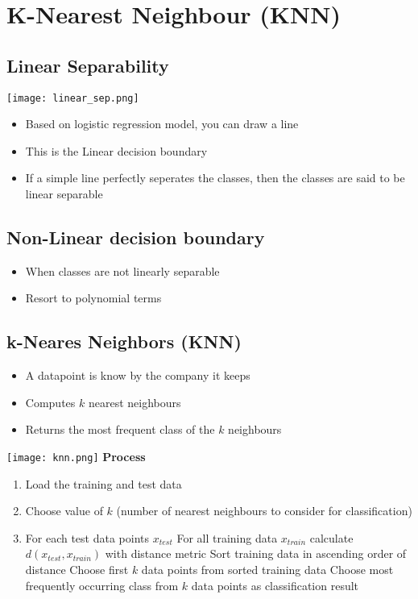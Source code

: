 \section{K-Nearest Neighbour (KNN)}
\subsection{Linear Separability}
\texttt{[image: linear\_sep.png]}

\begin{itemize}
    \item Based on logistic regression model, you can draw a line
    \item This is the Linear decision boundary
    \item If a simple line perfectly seperates the classes, then the classes are said to be linear separable
\end{itemize}

\subsection{Non-Linear decision boundary}
\begin{itemize}
    \item When classes are not linearly separable
    \item Resort to polynomial terms
\end{itemize}

\subsection{k-Neares Neighbors (KNN)}
\begin{itemize}
    \item A datapoint is know by the company it keeps
    \item Computes $k$ nearest neighbours
    \item Returns the most frequent class of the $k$ neighbours
\end{itemize}
\texttt{[image: knn.png]}
\textbf{Process}
\begin{enumerate}
    \item Load the training and test data
    \item Choose value of $k$ (number of nearest neighbours to consider for classification)
    \item For each test data points $x_{test}$
        \subitem For all training data $x_{train}$ calculate $d(x_{test}, x_{train})$ with distance metric
        \subitem Sort training data in ascending order of distance
        \subitem Choose first $k$ data points from sorted training data
        \subitem Choose most frequently occurring class from $k$ data points as classification result
\end{enumerate}


